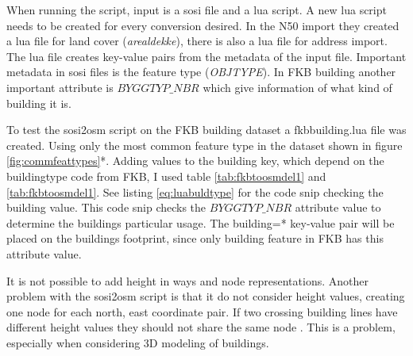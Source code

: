 When running the script, input is a sosi file and a lua script. A new lua script needs to be created for every conversion desired. In the N50 import they created a lua file for land cover (\textit{arealdekke}), there is also a lua file for address import. The lua file creates key-value pairs from the metadata of the input file. Important metadata in sosi files is the feature type (\textit{OBJTYPE}). In FKB building another important attribute is $BYGGTYP\_NBR$ which give information of what kind of building it is. 

To test the sosi2osm script on the FKB building dataset a fkbbuilding.lua file was created. Using only the most common feature type in the dataset shown in figure \ref{fig:commfeattypes}*.%
  Adding values to the building key, which depend on the buildingtype code from FKB, I used table \ref{tab:fkbtoosmdel1} and \ref{tab:fkbtoosmdel1}. See listing \ref{eq:luabuldtype} for the code snip checking the building value. This code snip checks the $BYGGTYP\_NBR$ attribute value to determine the buildings particular usage. The building=* key-value pair will be placed on the buildings footprint, since only building feature in FKB has this attribute value. 

It is not possible to add height in ways and node representations. Another problem with the sosi2osm script is that it do not consider height values, creating one node for each north, east coordinate pair. If two crossing building lines have different height values they should not share the same node \cite{OpenStreetMap2015}. This is a problem, especially when considering 3D modeling of buildings. 


